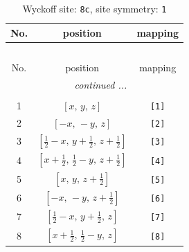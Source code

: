 \documentclass[fleqn,8pt]{jsarticle}
\begin{document}
\renewcommand{\arraystretch}{1.2}
\begin{longtable}{ccc}
\caption{Wyckoff site: {\tt 8c}, site symmetry: {\tt 1}}
 \\
 \hline \hline
No. & position & mapping \\ \hline \endfirsthead

\multicolumn{2}{l}{\tablename\ \thetable{}} \\
 \hline \hline
No. & position & mapping \\ \hline \endhead

 \hline \hline
\multicolumn{2}{r}{\footnotesize\it continued ...} \\ \endfoot

 \hline \hline
\multicolumn{2}{r}{} \\ \endlastfoot

1 & $\left[ x,\, y,\, z \right]$ & {\tt [1]} \\ \hline
2 & $\left[ - x,\, - y,\, z \right]$ & {\tt [2]} \\ \hline
3 & $\left[ \frac{1}{2} - x,\, y + \frac{1}{2},\, z + \frac{1}{2} \right]$ & {\tt [3]} \\ \hline
4 & $\left[ x + \frac{1}{2},\, \frac{1}{2} - y,\, z + \frac{1}{2} \right]$ & {\tt [4]} \\ \hline
5 & $\left[ x,\, y,\, z + \frac{1}{2} \right]$ & {\tt [5]} \\ \hline
6 & $\left[ - x,\, - y,\, z + \frac{1}{2} \right]$ & {\tt [6]} \\ \hline
7 & $\left[ \frac{1}{2} - x,\, y + \frac{1}{2},\, z \right]$ & {\tt [7]} \\ \hline
8 & $\left[ x + \frac{1}{2},\, \frac{1}{2} - y,\, z \right]$ & {\tt [8]} \\
\end{longtable}
\end{document}
